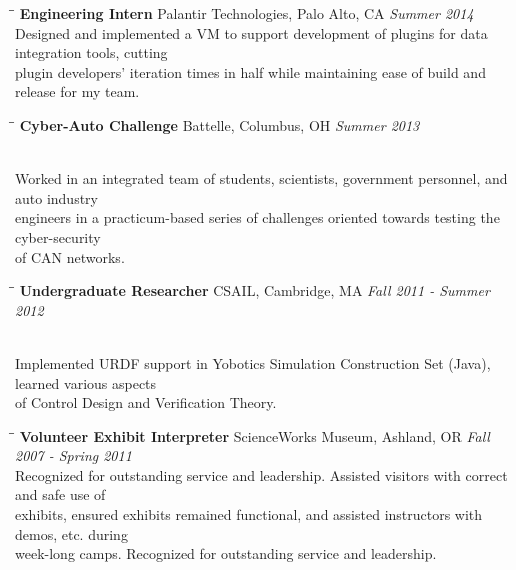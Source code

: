 \documentclass{res}
\begin{document}
\begin{resume}
			\begin{tabbing}
				\hspace{2.3in}\= \hspace{2.6in}\= \kill %
				{\bf Engineering Intern} \>Palantir Technologies, Palo Alto, CA \> \textit{Summer 2014}
				\\Designed and implemented a VM to support development of plugins for data integration tools, cutting
				\\plugin developers' iteration times in half while maintaining ease of build and release for my team.
			\end{tabbing}\vspace{-20pt}

			\begin{tabbing}
				\hspace{2.3in}\= \hspace{2.6in}\= \kill %
				{\bf Cyber-Auto Challenge}	\>Battelle, Columbus, OH	\> \textit{Summer 2013}

                \\Worked in an integrated team of students, scientists, government personnel, and auto industry
                \\engineers in a practicum-based series of challenges oriented towards testing the cyber-security
                \\of CAN networks.
			\end{tabbing}\vspace{-20pt}

			\begin{tabbing}
				\hspace{2.3in}\= \hspace{2.6in}\= \kill %
				{\bf Undergraduate Researcher}	\>CSAIL, Cambridge, MA	\> \textit{Fall 2011 - Summer 2012}

				\\Implemented URDF support in Yobotics Simulation Construction Set (Java), learned various aspects
				\\of Control Design and Verification Theory.

			\end{tabbing}\vspace{-20pt}

			\begin{tabbing}
				\hspace{2.3in}\= \hspace{2.6in}\= \kill %
				{\bf Volunteer Exhibit Interpreter}	\>ScienceWorks Museum, Ashland, OR	\> \textit{Fall 2007 - Spring 2011}
				\\Recognized for outstanding service and leadership. Assisted visitors with correct and safe use of
				\\ exhibits, ensured exhibits remained functional, and assisted instructors with demos, etc. during
				\\ week-long camps. Recognized for outstanding service and leadership.
			\end{tabbing}\vspace{-20pt}


\end{resume}
\end{document}
